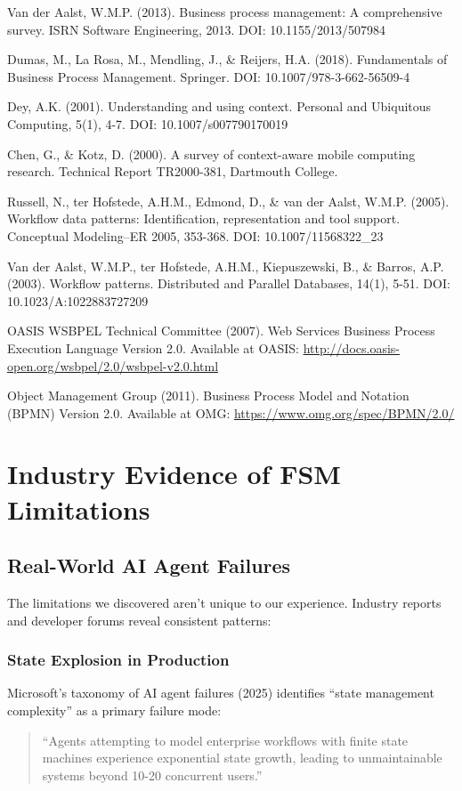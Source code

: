 \documentclass[11pt,a4paper]{article}
\begin{document}
Van der Aalst, W.M.P. (2013). Business process management: A comprehensive survey. ISRN Software Engineering, 2013. DOI: 10.1155/2013/507984

Dumas, M., La Rosa, M., Mendling, J., \& Reijers, H.A. (2018). Fundamentals of Business Process Management. Springer. DOI: 10.1007/978-3-662-56509-4

Dey, A.K. (2001). Understanding and using context. Personal and Ubiquitous Computing, 5(1), 4-7. DOI: 10.1007/s007790170019

Chen, G., \& Kotz, D. (2000). A survey of context-aware mobile computing research. Technical Report TR2000-381, Dartmouth College.

Russell, N., ter Hofstede, A.H.M., Edmond, D., \& van der Aalst, W.M.P. (2005). Workflow data patterns: Identification, representation and tool support. Conceptual Modeling–ER 2005, 353-368. DOI: 10.1007/11568322\_23

Van der Aalst, W.M.P., ter Hofstede, A.H.M., Kiepuszewski, B., \& Barros, A.P. (2003). Workflow patterns. Distributed and Parallel Databases, 14(1), 5-51. DOI: 10.1023/A:1022883727209

OASIS WSBPEL Technical Committee (2007). Web Services Business Process Execution Language Version 2.0. Available at OASIS: \url{http://docs.oasis-open.org/wsbpel/2.0/wsbpel-v2.0.html}

Object Management Group (2011). Business Process Model and Notation (BPMN) Version 2.0. Available at OMG: \url{https://www.omg.org/spec/BPMN/2.0/}

\appendix

\section{Industry Evidence of FSM Limitations}

\subsection{Real-World AI Agent Failures}

The limitations we discovered aren't unique to our experience. Industry reports and developer forums reveal consistent patterns:

\subsubsection{State Explosion in Production}

Microsoft's taxonomy of AI agent failures (2025) identifies ``state management complexity'' as a primary failure mode:
\begin{quote}
``Agents attempting to model enterprise workflows with finite state machines experience exponential state growth, leading to unmaintainable systems beyond 10-20 concurrent users.''
\end{quote}
\end{document}
